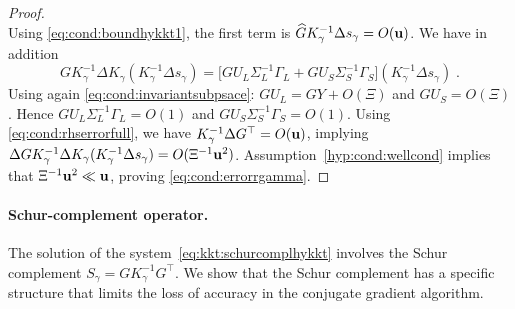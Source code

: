 \begin{proof}
\begin{equation}
\end{equation}
Using \eqref{eq:cond:boundhykkt1}, the first term is $\widehat{G} K_\gamma^{-1} \Delta s_\gamma = O(\mathbf{u})$.
We have in addition
\begin{equation}
  G K_\gamma^{-1}\Delta K_\gamma (K_\gamma^{-1} \Delta s_\gamma)  =
  \big[ G U_L \Sigma_L^{-1} \Gamma_L + G U_S \Sigma_S^{-1} \Gamma_S \big] (K_\gamma^{-1} \Delta s_\gamma) \; .
\end{equation}
Using again \eqref{eq:cond:invariantsubpsace}:
$G U_L = G Y + O(\Xi)$ and $G U_S = O(\Xi)$. Hence
$G U_L \Sigma_L^{-1} \Gamma_L = O(1)$ and $G U_S \Sigma_S^{-1} \Gamma_S = O(1)$.
Using \eqref{eq:cond:rhserrorfull}, we have $K_\gamma^{-1} \Delta G^\top = O(\mathbf{u})$,
implying $\Delta G K_\gamma^{-1} \Delta K_\gamma (K_\gamma^{-1} \Delta s_\gamma) = O(\Xi^{-1} \mathbf{u}^{2})$.
Assumption~\ref{hyp:cond:wellcond} implies that $\Xi^{-1} \mathbf{u}^2 \ll \mathbf{u}$,
proving \eqref{eq:cond:errorrgamma}.
\end{proof}

\paragraph{Schur-complement operator.}
The solution of the system~\eqref{eq:kkt:schurcomplhykkt}
involves the Schur complement $S_\gamma = G K_\gamma^{-1} G^\top$.
We show that the Schur complement
has a specific structure that limits the loss of accuracy
in the conjugate gradient algorithm.

